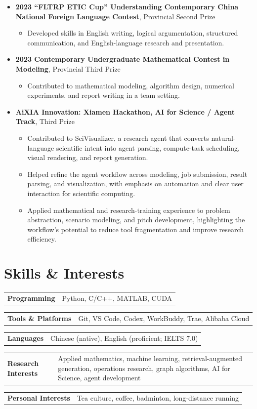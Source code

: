 \documentclass[letterpaper,10pt]{article}
\makeatletter
\newcommand{\skillItem}[2]{
    \noindent
    \begin{tabularx}{\textwidth}{@{}>{\raggedright\arraybackslash}p{3.7cm}@{\hspace{0.4cm}}X@{}}
        \textbf{#1} & #2
    \end{tabularx}
    \vspace{0.5pt}
}
\makeatother
\begin{document}
\begin{itemize}
    \item \textbf{2023 ``FLTRP ETIC Cup'' Understanding Contemporary China National Foreign Language Contest}, Provincial Second Prize
    \begin{itemize}
        \item Developed skills in English writing, logical argumentation, structured communication, and English-language research and presentation.
    \end{itemize}

    \item \textbf{2023 Contemporary Undergraduate Mathematical Contest in Modeling}, Provincial Third Prize
    \begin{itemize}
        \item Contributed to mathematical modeling, algorithm design, numerical experiments, and report writing in a team setting.
    \end{itemize}

    \item \textbf{AiXIA Innovation: Xiamen Hackathon, AI for Science / Agent Track}, Third Prize
    \begin{itemize}
        \item Contributed to SciVisualizer, a research agent that converts natural-language scientific intent into agent parsing, compute-task scheduling, visual rendering, and report generation.
        \item Helped refine the agent workflow across modeling, job submission, result parsing, and visualization, with emphasis on automation and clear user interaction for scientific computing.
        \item Applied mathematical and research-training experience to problem abstraction, scenario modeling, and pitch development, highlighting the workflow's potential to reduce tool fragmentation and improve research efficiency.
    \end{itemize}
\end{itemize}

\section{Skills \& Interests}

\skillItem{Programming}{Python, C/C++, MATLAB, CUDA}
\skillItem{Tools \& Platforms}{Git, VS Code, Codex, WorkBuddy, Trae, Alibaba Cloud}
\skillItem{Languages}{Chinese (native), English (proficient; IELTS 7.0)}
\skillItem{Research Interests}{Applied mathematics, machine learning, retrieval-augmented generation, operations research, graph algorithms, AI for Science, agent development}
\skillItem{Personal Interests}{Tea culture, coffee, badminton, long-distance running}
\end{document}
